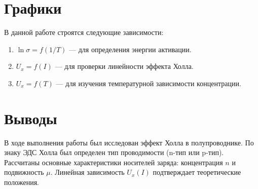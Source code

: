 \documentclass[a4paper,12pt]{article}
\begin{document}
\section{Графики}
В данной работе строятся следующие зависимости:
\begin{enumerate}
    \item $\ln \sigma = f(1/T)$ --- для определения энергии активации.
    \item $U_x = f(I)$ --- для проверки линейности эффекта Холла.
    \item $U_x = f(T)$ --- для изучения температурной зависимости концентрации.
\end{enumerate}

\section{Выводы}
В ходе выполнения работы был исследован эффект Холла в полупроводнике. По знаку ЭДС Холла был определен тип проводимости (n-тип или p-тип). Рассчитаны основные характеристики носителей заряда: концентрация $n$ и подвижность $\mu$. Линейная зависимость $U_x(I)$ подтверждает теоретические положения.
\end{document}
